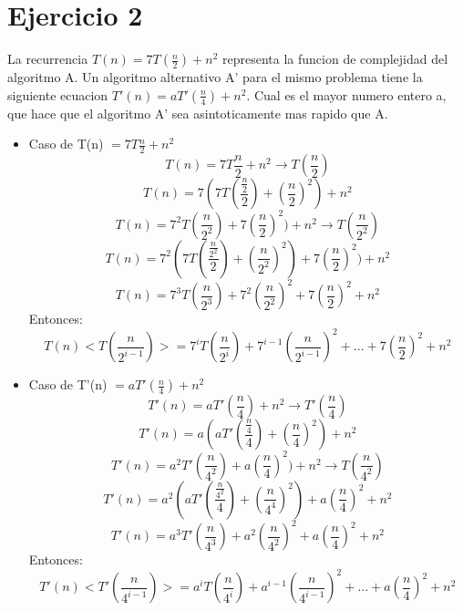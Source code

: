 \documentclass[10pt,a4paper]{article}
\begin{document}
\section{Ejercicio 2}
	La recurrencia $T(n) = 7T( \frac{n}{2} )+n^{2}$ representa la funcion de complejidad del algoritmo A. Un algoritmo alternativo A’ para el mismo problema tiene la siguiente ecuacion ${T}'(n) = a{T}'( \frac{n}{4} ) + n^{2}$. Cual es el
mayor numero entero a, que hace que el algoritmo A’ sea asintoticamente mas rapido que A.
	\begin{itemize}
		\item Caso de T(n) $= 7T \frac{n}{2}+n^{2}$
			\begin{equation*}
				T(n) = 7T \frac{n}{2}+n^{2} \rightarrow T(\frac{n}{2})
			\end{equation*}
			\begin{equation*}
				T(n) = 7(7T(\frac{\frac{n}{2}}{2})+ (\frac{n}{2})^{2})+n^{2}
			\end{equation*}
			\begin{equation*}
				T(n) = 7^{2}T(\frac{n}{2^{2}})+7(\frac{n}{2})^{2})+n^{2} \rightarrow T(\frac{n}{2^{2}})
			\end{equation*}
			\begin{equation*}
				T(n) = 7^{2}(7T(\frac{\frac{n}{2^{2}}}{2})+(\frac{n}{2^{2}})^{2})+7(\frac{n}{2})^{2})+n^{2} 
			\end{equation*}
			\begin{equation*}
				T(n) = 7^{3}T(\frac{n}{2^{3}})+7^{2}(\frac{n}{2^{2}})^{2}+7(\frac{n}{2})^{2}+n^{2} 
			\end{equation*}
			Entonces:
			\begin{equation*}
				T(n)<T(\frac{n}{2^{i-1}})> = 7^{i}T(\frac{n}{2^{i}})+7^{i-1}(\frac{n}{2^{i-1}})^{2}+ ... + 7(\frac{n}{2})^{2}+n^{2} 
			\end{equation*}
		\item Caso de T'(n) $ = aT'(\frac{n}{4})+n^{2}$
			\begin{equation*}
				T'(n) = aT'(\frac{n}{4})+n^{2} \rightarrow T'(\frac{n}{4})
			\end{equation*}
			\begin{equation*}
				T'(n) = a(aT'(\frac{\frac{n}{4}}{4})+ (\frac{n}{4})^{2})+n^{2}
			\end{equation*}
			\begin{equation*}
				T'(n) = a^{2}T'(\frac{n}{4^{2}})+a(\frac{n}{4})^{2})+n^{2} \rightarrow T(\frac{n}{4^{2}})
			\end{equation*}
			\begin{equation*}
				T'(n) = a^{2}(aT'(\frac{\frac{n}{4^{2}}}{4})+(\frac{n}{4^{4}})^{2})+a(\frac{n}{4})^{2}+n^{2} 
			\end{equation*}
			\begin{equation*}
				T'(n) = a^{3}T'(\frac{n}{4^{3}})+a^{2}(\frac{n}{4^{2}})^{2}+a(\frac{n}{4})^{2}+n^{2} 
			\end{equation*}
			Entonces:
			\begin{equation*}
				T'(n)<T'(\frac{n}{4^{i-1}})> = a^{i}T(\frac{n}{4^{i}})+a^{i-1}(\frac{n}{4^{i-1}})^{2}+ ... + a(\frac{n}{4})^{2}+n^{2} 
			\end{equation*}
	\end{itemize}
\end{document}
